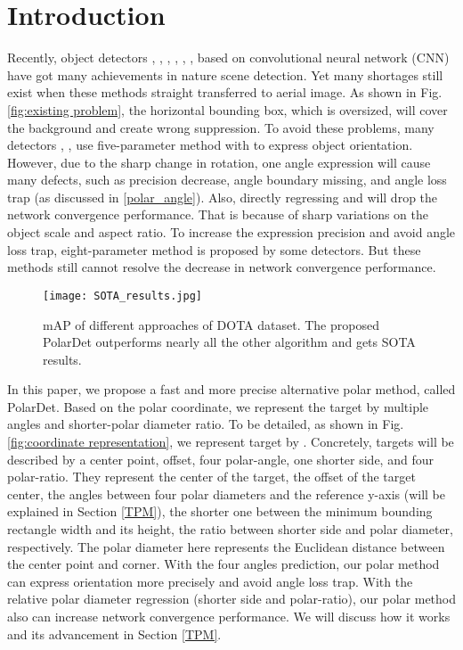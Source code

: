 \documentclass[10pt,twocolumn]{article}
\begin{document}
\section{Introduction}
Recently, object detectors \cite{uijlings2013selective}, \cite{girshick2014rich}, \cite{he2015spatial}, \cite{girshick2015fast}, \cite{ren2015faster}, \cite{dai2016r}, \cite{redmon2016you} based on convolutional neural network (CNN) have got many achievements in nature scene detection. Yet many shortages still exist when these methods straight transferred to aerial image. As shown in Fig.\ref{fig:existing problem}, the horizontal bounding box, which is oversized, will cover the background and create wrong suppression. To avoid these problems, many detectors \cite{yang2019r3det}, \cite{azimi2018towards}, \cite{ding2019learning} use five-parameter method with   to express object orientation. However, due to the sharp change in rotation, one angle expression will cause many defects, such as precision decrease, angle boundary missing, and angle loss trap (as discussed in \ref{polar_angle}). Also, directly regressing  and  will drop the network convergence performance. That is because of sharp variations on the object scale and aspect ratio. To increase the expression precision and avoid angle loss trap, eight-parameter method  is proposed by some detectors. But these methods still cannot resolve the decrease in network convergence performance.

\begin{figure}[t]
	\centering
	\texttt{[image: SOTA\_results.jpg]}	
	\caption{mAP of different approaches of DOTA dataset. The proposed PolarDet outperforms nearly all the other algorithm and gets SOTA results.}
	\label{fig:SOTA results}
\end{figure}

In this paper, we propose a fast and more precise alternative polar method, called PolarDet. Based on the polar coordinate, we represent the target by multiple angles and shorter-polar diameter ratio. To be detailed, as shown in Fig.\ref{fig:coordinate representation}, we represent target by . Concretely, targets will be described by a center point, offset, four polar-angle, one shorter side, and four polar-ratio. They represent the center of the target, the offset of the target center, the angles between four polar diameters and the reference y-axis (will be explained in Section \ref{TPM}), the shorter one between the minimum bounding rectangle width and its height, the ratio between shorter side and polar diameter, respectively. The polar diameter here represents the Euclidean distance between the center point and corner. With the four angles prediction, our polar method can express orientation more precisely and avoid angle loss trap. With the relative polar diameter regression (shorter side and polar-ratio), our polar method also can increase network convergence performance. We will discuss how it works and its advancement in Section \ref{TPM}.
\end{document}
